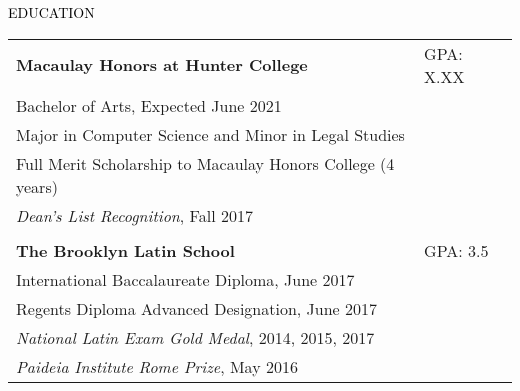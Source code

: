 \documentclass{resume} %
\renewenvironment{rSection}[1]{
  \sectionskip
  \textcolor{Black}{\MakeUppercase{#1}}
  \sectionlineskip
  \begin{list}{}{
      \setlength{\leftmargin}{1.5em}
    }
  \item[]
}{
  \end{list}
}
\begin{document}
\begin{rSection}{Education}

  \begin{tabular}{ @{} >{}l @{\hspace{-10ex}} l }
      {\bf Macaulay Honors at Hunter College} & GPA: X.XX
    \\ Bachelor of Arts, Expected June 2021
    \\ Major in Computer Science and Minor in Legal Studies
    \\ Full Merit Scholarship to Macaulay Honors College (4 years)
    \\ {\em Dean's List Recognition}, Fall 2017
    \\
    \\ {\bf The Brooklyn Latin School} & GPA: 3.5 
    \\ International Baccalaureate Diploma, June 2017
    \\ Regents Diploma Advanced Designation, June 2017
    \\ {\em National Latin Exam Gold Medal}, 2014, 2015, 2017
    \\ {\em Paideia Institute Rome Prize}, May 2016
  \end{tabular}

\end{rSection}
\end{document}
